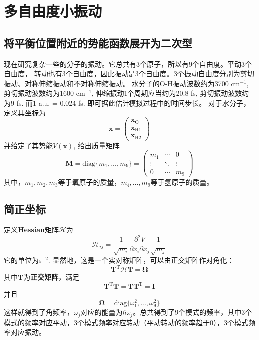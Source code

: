 \chapter{多自由度小振动}
    \section{将平衡位置附近的势能函数展开为二次型}
    现在研究复杂一些的分子的振动。它总共有3个原子，所以有9个自由度。平动3个自由度，
    转动也有3个自由度，因此振动是3个自由度。3个振动自由度分别为剪切振动、对称伸缩振动和不对称伸缩振动。
    水分子的O-H振动波数约为3700 cm$^{-1}$, 剪切振动波数约为1600 cm$^{-1}$, 
    伸缩振动1个周期应当约为20.8 fs, 剪切振动波数约为9 fs. 而1 a.u. = 0.024 fs.
    即可据此估计模拟过程中的时间步长。
    对于水分子，定义其坐标为
    \begin{equation*}
        \bm{x} = 
        \begin{pmatrix}
            \bm{x}_\mathrm{O}\\
            \bm{x}_{\mathrm{H1}}\\
            \bm{x}_{\mathrm{H2}}
        \end{pmatrix}
    \end{equation*}
    并给定了其势能$V(\bm{x})$, 给出质量矩阵
    \begin{equation*}
        \bm{M} = \mathrm{diag} \{m_1,...,m_9 \} = 
        \begin{pmatrix}
            m_1 & \cdots & 0\\
            \vdots & \ddots & \vdots\\
            0 & \cdots & m_9
        \end{pmatrix}
    \end{equation*}
    其中，$m_1,m_2,m_3$等于氧原子的质量，$m_4,...,m_9$等于氢原子的质量。

    \section{简正坐标}
    定义\textbf{Hessian}矩阵$\bm{\mathcal{H}}$为 
    \begin{equation*}
        \bm{\mathcal{H}}_{ij} = \frac 1{\sqrt{m_i}} \frac {\partial^2 V}{\partial x_i \partial x_j} \frac 1{\sqrt{m_j}}
    \end{equation*}
    它的单位为s$^{-2}$. 显然地，这是一个实对称矩阵，可以由正交矩阵作对角化：
    \begin{equation*}
        \bm{T}^\mathrm{T} \bm{\mathcal{H}T = \Omega}
    \end{equation*}
    其中$\bm{T}$为\textbf{正交矩阵}，满足 
    \begin{equation*}
        \bm{T}^\mathrm{T}\bm{T} = \bm{TT}^\mathrm{T} = \bm{I}
    \end{equation*}
    并且
    \begin{equation*}
        \bm{\Omega} = \mathrm{diag} \{\omega_1^2, ..., \omega_9^2 \}
    \end{equation*}
    这样就得到了角频率，$\omega_j$对应的能量为$\hbar \omega_j$。总共得到了9个模式的频率，其中3个模式的频率对应平动，3个模式频率对应转动（平动转动的频率趋于0），3个模式频率对应振动。

